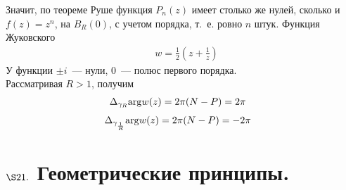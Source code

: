 Значит, по теореме Руше функция $P_n(z)$ имеет столько же нулей, сколько и $f(z)
= z^n$, на $B_R(0)$, с учетом порядка, т.~е. ровно $n$ штук.
\Example
Функция Жуковского
\begin{align*}
  & w = \frac{1}{2}\left( z+\frac{1}{z} \right)
\end{align*}
У функции $\pm i$~--- нули, $0$~--- полюс первого порядка.
\\
Рассматривая $R>1$, получим
\begin{align*}
  & \Delta_{\gamma_R}\mathrm{arg} w(z) = 2 \pi (N-P) = 2\pi
\end{align*}
\begin{align*}
  & \Delta_{\gamma_{\frac{1}{R}}}\mathrm{arg} w(z) = 2 \pi (N-P) = -2\pi
\end{align*}
\section{$\S 21.$ Геометрические принципы.}
